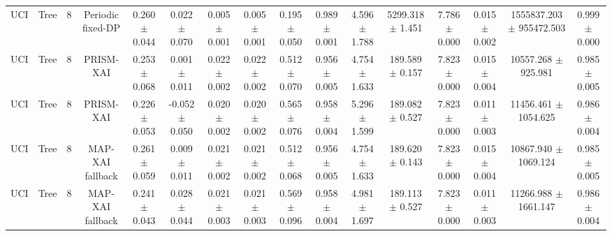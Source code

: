 \begin{tabular}{lccccccccccccccc}
UCI & Tree & 8 & Periodic fixed-DP & 0.260 $\pm$ 0.044 & 0.022 $\pm$ 0.070 & 0.005 $\pm$ 0.001 & 0.005 $\pm$ 0.001 & 0.195 $\pm$ 0.050 & 0.989 $\pm$ 0.001 & 4.596 $\pm$ 1.788 & 5299.318 $\pm$ 1.451 & 7.786 $\pm$ 0.000 & 0.015 $\pm$ 0.002 & 1555837.203 $\pm$ 955472.503 & 0.999 $\pm$ 0.000 \\
UCI & Tree & 8 & PRISM-XAI & 0.253 $\pm$ 0.068 & 0.001 $\pm$ 0.011 & 0.022 $\pm$ 0.002 & 0.022 $\pm$ 0.002 & 0.512 $\pm$ 0.070 & 0.956 $\pm$ 0.005 & 4.754 $\pm$ 1.633 & 189.589 $\pm$ 0.157 & 7.823 $\pm$ 0.000 & 0.015 $\pm$ 0.004 & 10557.268 $\pm$ 925.981 & 0.985 $\pm$ 0.005 \\
UCI & Tree & 8 & PRISM-XAI & 0.226 $\pm$ 0.053 & -0.052 $\pm$ 0.050 & 0.020 $\pm$ 0.002 & 0.020 $\pm$ 0.002 & 0.565 $\pm$ 0.076 & 0.958 $\pm$ 0.004 & 5.296 $\pm$ 1.599 & 189.082 $\pm$ 0.527 & 7.823 $\pm$ 0.000 & 0.011 $\pm$ 0.003 & 11456.461 $\pm$ 1054.625 & 0.986 $\pm$ 0.004 \\
UCI & Tree & 8 & MAP-XAI fallback & 0.261 $\pm$ 0.059 & 0.009 $\pm$ 0.011 & 0.021 $\pm$ 0.002 & 0.021 $\pm$ 0.002 & 0.512 $\pm$ 0.068 & 0.956 $\pm$ 0.005 & 4.754 $\pm$ 1.633 & 189.620 $\pm$ 0.143 & 7.823 $\pm$ 0.000 & 0.015 $\pm$ 0.004 & 10867.940 $\pm$ 1069.124 & 0.985 $\pm$ 0.005 \\
UCI & Tree & 8 & MAP-XAI fallback & 0.241 $\pm$ 0.043 & 0.028 $\pm$ 0.044 & 0.021 $\pm$ 0.003 & 0.021 $\pm$ 0.003 & 0.569 $\pm$ 0.096 & 0.958 $\pm$ 0.004 & 4.981 $\pm$ 1.697 & 189.113 $\pm$ 0.527 & 7.823 $\pm$ 0.000 & 0.011 $\pm$ 0.003 & 11266.988 $\pm$ 1661.147 & 0.986 $\pm$ 0.004 \\
\bottomrule
\end{tabular}
